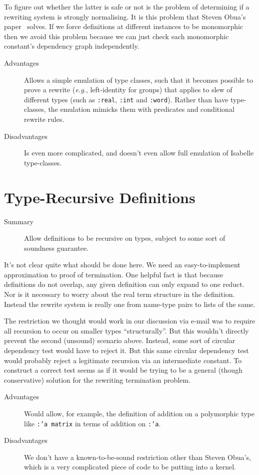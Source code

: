 \documentclass[11pt]{article}
\begin{document}
To figure out whether the latter is safe or not is the problem of
determining if a rewriting system is strongly normalising.  It is this
problem that Steven Obua's paper~\cite{Obua-RTA06} solves.  If we
force definitions at different instances to be monomorphic then we
avoid this problem because we can just check each monomorphic
constant's dependency graph independently.

\begin{description}
\item[Advantages] Allows a simple emulation of type classes, such that
  it becomes possible to prove a rewrite (\emph{e.g.}, left-identity
  for groups) that applies to slew of different types (such as
  \texttt{:real}, \texttt{:int} and \texttt{:word}).  Rather than have
  type-classes, the emulation mimicks them with predicates and
  conditional rewrite rules.
\item[Disadvantages] Is even more complicated, and doesn't even allow
  full emulation of Isabelle type-classes.
\end{description}


\section{Type-Recursive Definitions}
\label{sec:type-recurs-defin}

\begin{description}
\item[Summary] Allow definitions to be recursive on types, subject to
  some sort of soundness guarantee.
\end{description}

It's not clear quite what should be done here.  We need an
easy-to-implement approximation to proof of termination.  One helpful
fact is that because definitions do not overlap, any given definition
can only expand to one reduct.  Nor is it necessary to worry about the
real term structure in the definition.  Instead the rewrite system is
really one from name-type pairs to lists of the same.

The restriction we thought would work in our discussion via e-mail was
to require all recursion to occur on smaller types ``structurally''.
But this wouldn't directly prevent the second (unsound) scenario
above.  Instead, some sort of circular dependency test would have to
reject it.  But this same circular dependency test would probably
reject a legitimate recursion via an intermediate constant.  To
construct a correct test seems as if it would be trying to be a
general (though conservative) solution for the rewriting termination
problem.

\begin{description}
\item[Advantages] Would allow, for example, the definition of addition
  on a polymorphic type like \texttt{:'a~matrix} in terms of addition
  on \texttt{:'a}.
\item[Disadvantages] We don't have a known-to-be-sound restriction
  other than Steven Obua's, which is a very complicated piece of code
  to be putting into a kernel.
\end{description}



\end{document}
